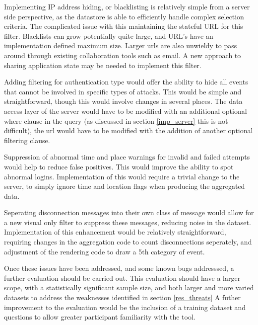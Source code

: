 Implementing IP address hiding, or blacklisting is relatively simple from a server side perspective, as the datastore is able to efficiently handle complex selection criteria. The complicated issue with this maintaining the stateful URL for this filter. Blacklists can grow potentially quite large, and URL's have an implementation defined maximum size. Larger urls are also unwieldy to pass around through existing collaboration tools such as email. A new approach to sharing application state may be needed to implement this filter.

Adding filtering for authentication type would offer the ability to hide all events that cannot be involved in specific types of attacks. This would be simple and straightforward, though this would involve changes in several places. The data access layer of the server would have to be modified with an additional optional where clause in the query (as discussed in section \ref{imp_server} this is not difficult), the url would have to be modified with the addition of another optional filtering clause.

Suppression of abnormal time and place warnings for invalid and failed attempts would help to reduce false positives. This would improve the ability to spot abnormal logins. Implementation of this would require a trivial change to the server, to simply ignore time and location flags when producing the aggregated data. 

Seperating disconnection messages into their own class of message would allow for a new visual only filter to suppress these messages, reducing noise in the dataset. Implementation of this enhancement would be relatively straightforward, requiring changes in the aggregation code to count disconnections seperately, and adjustment of the rendering code to draw a 5th category of event. 

Once these issues have been addressed, and some known bugs addresssed, a further evaluation should be carried out. This evaluation should have a larger scope, with a statistically significant sample size, and both larger and more varied datasets to address the weaknesses identified in section \ref{res_threats} A futher improvement to the evaluation would be the inclusion of a training dataset and questions to allow greater participant familiarity with the tool. 